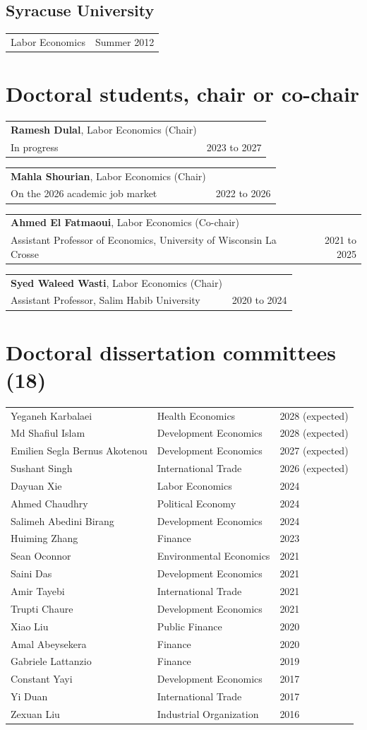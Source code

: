 \documentclass[10.5pt]{article}
\makeatletter
\newcommand{\cvrow}[2]{\noindent\begin{tabularx}{\textwidth}{@{}X r@{}} #1 & {\small\color{gray} #2} \end{tabularx}\par}
\makeatother
\begin{document}
\subsection{Syracuse University}
\cvrow{Labor Economics}{Summer 2012}
\section{Doctoral students, chair or co-chair}
\cvrow{\textbf{Ramesh Dulal}, Labor Economics (Chair)\\ {\small In progress}}{2023 to 2027}
\cvrow{\textbf{Mahla Shourian}, Labor Economics (Chair)\\ {\small On the 2026 academic job market}}{2022 to 2026}
\cvrow{\textbf{Ahmed El Fatmaoui}, Labor Economics (Co-chair)\\ {\small Assistant Professor of Economics, University of Wisconsin La Crosse}}{2021 to 2025}
\cvrow{\textbf{Syed Waleed Wasti}, Labor Economics (Chair)\\ {\small Assistant Professor, Salim Habib University}}{2020 to 2024}
\section{Doctoral dissertation committees (18)}
\begin{longtable}{@{}p{} p{} p{}@{}}
Yeganeh Karbalaei & Health Economics & 2028 (expected) \\
Md Shafiul Islam & Development Economics & 2028 (expected) \\
Emilien Segla Bernus Akotenou & Development Economics & 2027 (expected) \\
Sushant Singh & International Trade & 2026 (expected) \\
Dayuan Xie & Labor Economics & 2024 \\
Ahmed Chaudhry & Political Economy & 2024 \\
Salimeh Abedini Birang & Development Economics & 2024 \\
Huiming Zhang & Finance & 2023 \\
Sean Oconnor & Environmental Economics & 2021 \\
Saini Das & Development Economics & 2021 \\
Amir Tayebi & International Trade & 2021 \\
Trupti Chaure & Development Economics & 2021 \\
Xiao Liu & Public Finance & 2020 \\
Amal Abeysekera & Finance & 2020 \\
Gabriele Lattanzio & Finance & 2019 \\
Constant Yayi & Development Economics & 2017 \\
Yi Duan & International Trade & 2017 \\
Zexuan Liu & Industrial Organization & 2016 \\
\end{longtable}
\end{document}
